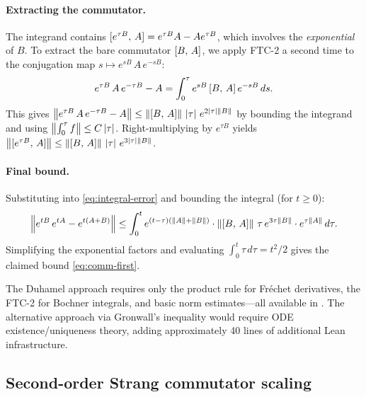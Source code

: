 \paragraph{Extracting the commutator.}
The integrand contains $[e^{\tau B},\,A] = e^{\tau B}A - Ae^{\tau B}$,
which involves the \emph{exponential} of $B$. To extract the bare commutator
$[B,\,A]$, we apply FTC-2 a second time to the conjugation map
$s \mapsto e^{sB}\,A\,e^{-sB}$:
\begin{equation}\label{eq:conj-ftc}
  e^{\tau B}\,A\,e^{-\tau B} - A
    = \int_0^{\tau} e^{sB}\,[B,\,A]\,e^{-sB}\,ds.
\end{equation}
This gives $\left\|e^{\tau B}\,A\,e^{-\tau B} - A\right\|
  \le \left\|[B,\,A]\right\|\,\left|\tau\right|\,e^{2\left|\tau\right|\left\|B\right\|}$
by bounding the integrand and using
$\left\|\int_0^\tau f\right\| \le C\left|\tau\right|$.
Right-multiplying by $e^{\tau B}$ yields
$\left\|[e^{\tau B},\,A]\right\| \le \left\|[B,\,A]\right\|\,\left|\tau\right|\,e^{3\left|\tau\right|\left\|B\right\|}$.

\paragraph{Final bound.}
Substituting into \eqref{eq:integral-error} and bounding the integral (for
$t \ge 0$):
\[
  \left\|e^{tB}\,e^{tA} - e^{t(A+B)}\right\|
    \le \int_0^t e^{(t-\tau)(\left\|A\right\|+\left\|B\right\|)} \cdot
      \left\|[B,\,A]\right\|\,\tau\,e^{3\tau\left\|B\right\|} \cdot e^{\tau\left\|A\right\|}\,d\tau.
\]
Simplifying the exponential factors and evaluating $\int_0^t \tau\,d\tau = t^2/2$
gives the claimed bound \eqref{eq:comm-first}.

\begin{remark}
  The Duhamel approach requires only the product rule for Fr\'{e}chet
  derivatives, the FTC-2 for Bochner integrals, and basic norm estimates---all
  available in \Mathlib. The alternative approach via Gronwall's inequality
  would require ODE existence/uniqueness theory, adding approximately 40 lines
  of additional Lean infrastructure.
\end{remark}

\subsection{Second-order Strang commutator scaling}
\label{sec:strang}

